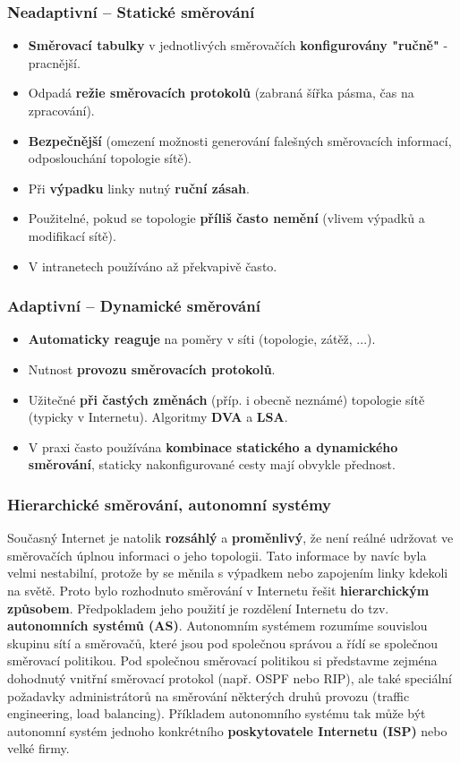 \subsubsection{Neadaptivní -- Statické směrování}
\begin{itemize}
\item \textbf{Směrovací tabulky} v jednotlivých směrovačích \textbf{konfigurovány "ručně"} - pracnější.
\item Odpadá \textbf{režie směrovacích protokolů} (zabraná šířka pásma, čas na zpracování).
\item \textbf{Bezpečnější} (omezení možnosti generování falešných směrovacích informací, odposlouchání topologie sítě).
\item Při \textbf{výpadku} linky nutný \textbf{ruční zásah}.
\item Použitelné, pokud se topologie \textbf{příliš často nemění} (vlivem výpadků a modifikací sítě).
\item V intranetech používáno až překvapivě často.
\end{itemize}

\subsubsection{Adaptivní -- Dynamické směrování}
\begin{itemize}
\item \textbf{Automaticky reaguje} na poměry v síti (topologie, zátěž, ...).
\item Nutnost\textbf{ provozu směrovacích protokolů}.
\item Užitečné \textbf{při častých změnách} (příp. i obecně neznámé) topologie sítě (typicky v Internetu). Algoritmy \textbf{DVA} a \textbf{LSA}.
\item V praxi často používána \textbf{kombinace statického a dynamického směrování}, staticky nakonfigurované cesty mají obvykle přednost.
\end{itemize}

\subsubsection{Hierarchické směrování, autonomní systémy}
Současný Internet je natolik \textbf{rozsáhlý} a \textbf{proměnlivý}, že není reálné udržovat ve směrovačích úplnou informaci o jeho topologii. Tato informace by navíc byla velmi nestabilní, protože by se měnila s výpadkem nebo zapojením linky kdekoli na světě. Proto bylo rozhodnuto směrování v Internetu řešit \textbf{hierarchickým způsobem}. Předpokladem jeho použití je rozdělení Internetu do tzv. \textbf{autonomních systémů (AS)}. Autonomním systémem rozumíme souvislou skupinu sítí a směrovačů, které jsou pod společnou správou a řídí se společnou směrovací politikou. Pod společnou směrovací politikou si představme zejména dohodnutý vnitřní směrovací protokol (např. OSPF nebo RIP), ale také speciální požadavky administrátorů na směrování některých druhů provozu (traffic engineering, load balancing). Příkladem autonomního systému tak může být autonomní systém jednoho konkrétního\textbf{ poskytovatele Internetu (ISP)} nebo velké firmy.

